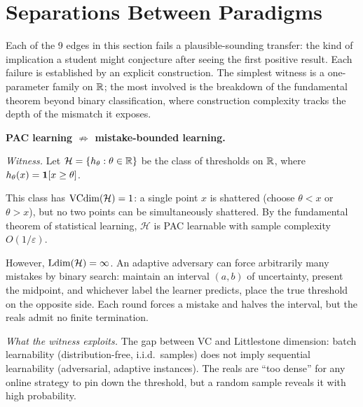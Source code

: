 
\section{Separations Between Paradigms}
\label{sec:separations}

Each of the 9  edges in this section fails a
plausible-sounding transfer: the kind of implication a student might
conjecture after seeing the first positive result. Each failure is
established by an explicit construction. The simplest witness is a
one-parameter family on $\mathbb{R}$; the most involved is the breakdown of the
fundamental theorem beyond binary classification, where construction
complexity tracks the depth of the mismatch it exposes.


\begin{separation}
\textbf{PAC learning $\not\Rightarrow$ mistake-bounded learning.}

\medskip\noindent
\emph{Witness.}
Let $\mathcal{H} = \{h_\theta : \theta \in \mathbb{R}\}$ be the class of
thresholds on $\mathbb{R}$, where $h_\theta(x) = \mathbf{1}[x \geq \theta]$.

This class has $\mathrm{VCdim}(\mathcal{H}) = 1$: a single point $x$ is shattered
(choose $\theta < x$ or $\theta > x$), but no two points can be
simultaneously shattered. By the fundamental theorem of statistical
learning, $\mathcal{H}$ is PAC learnable with sample complexity
$O(1/\varepsilon)$.

However, $\mathrm{Ldim}(\mathcal{H}) = \infty$. An adaptive adversary can force
arbitrarily many mistakes by binary search: maintain an interval
$(a, b)$ of uncertainty, present the midpoint, and whichever label the
learner predicts, place the true threshold on the opposite side. Each
round forces a mistake and halves the interval, but the reals admit
no finite termination.

\medskip\noindent
\emph{What the witness exploits.}
The gap between VC and Littlestone dimension: batch learnability
(distribution-free, i.i.d.\ samples) does not imply sequential
learnability (adversarial, adaptive instances). The reals are
``too dense'' for any online strategy to pin down the threshold,
but a random sample reveals it with high probability.

\hfill\cite{Littlestone1988}
\end{separation}

